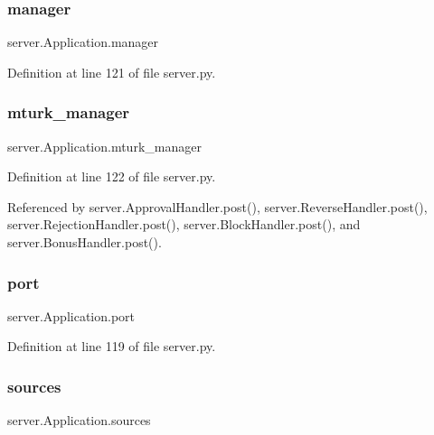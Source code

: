 \subsubsection{\texorpdfstring{manager}{manager}}
{\footnotesize\ttfamily server.\+Application.\+manager}



Definition at line 121 of file server.\+py.

\mbox{\label{classserver_1_1Application_a8a8c20c18dd4229b39b43c7f7cccedcb}} 
\subsubsection{\texorpdfstring{mturk\+\_\+manager}{mturk\_manager}}
{\footnotesize\ttfamily server.\+Application.\+mturk\+\_\+manager}



Definition at line 122 of file server.\+py.



Referenced by server.\+Approval\+Handler.\+post(), server.\+Reverse\+Handler.\+post(), server.\+Rejection\+Handler.\+post(), server.\+Block\+Handler.\+post(), and server.\+Bonus\+Handler.\+post().

\mbox{\label{classserver_1_1Application_a46dd670e0b39f8b44bb1cf0a4114bf80}} 
\subsubsection{\texorpdfstring{port}{port}}
{\footnotesize\ttfamily server.\+Application.\+port}



Definition at line 119 of file server.\+py.

\mbox{\label{classserver_1_1Application_a9d456193276c9e26164922ba20a8dfb6}} 
\subsubsection{\texorpdfstring{sources}{sources}}
{\footnotesize\ttfamily server.\+Application.\+sources}



